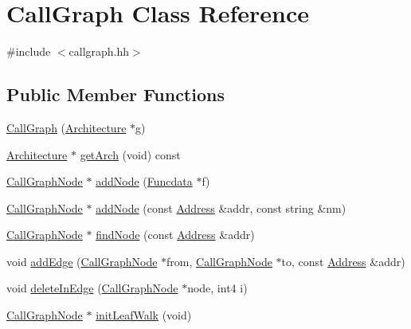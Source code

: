 \hypertarget{class_call_graph}{}\section{Call\+Graph Class Reference}
\label{class_call_graph}


{\ttfamily \#include $<$callgraph.\+hh$>$}

\subsection*{Public Member Functions}
\begin{DoxyCompactItemize}
\item 
\mbox{\hyperlink{class_call_graph_a4e571ae9abe012afa6265dd7b95835cb}{Call\+Graph}} (\mbox{\hyperlink{class_architecture}{Architecture}} $\ast$g)
\item 
\mbox{\hyperlink{class_architecture}{Architecture}} $\ast$ \mbox{\hyperlink{class_call_graph_a8c6cd0bdd5cfc3e3e5b34890820de311}{get\+Arch}} (void) const
\item 
\mbox{\hyperlink{class_call_graph_node}{Call\+Graph\+Node}} $\ast$ \mbox{\hyperlink{class_call_graph_ae04a791d05bc2b05942e33ab58f01f45}{add\+Node}} (\mbox{\hyperlink{class_funcdata}{Funcdata}} $\ast$f)
\item 
\mbox{\hyperlink{class_call_graph_node}{Call\+Graph\+Node}} $\ast$ \mbox{\hyperlink{class_call_graph_ae89cb838d6da0c1febdb1e52e38c1e35}{add\+Node}} (const \mbox{\hyperlink{class_address}{Address}} \&addr, const string \&nm)
\item 
\mbox{\hyperlink{class_call_graph_node}{Call\+Graph\+Node}} $\ast$ \mbox{\hyperlink{class_call_graph_afcb9ae755c10124ffae9e3808993a5bc}{find\+Node}} (const \mbox{\hyperlink{class_address}{Address}} \&addr)
\item 
void \mbox{\hyperlink{class_call_graph_ad7507630c86bb153d772f48d00210b48}{add\+Edge}} (\mbox{\hyperlink{class_call_graph_node}{Call\+Graph\+Node}} $\ast$from, \mbox{\hyperlink{class_call_graph_node}{Call\+Graph\+Node}} $\ast$to, const \mbox{\hyperlink{class_address}{Address}} \&addr)
\item 
void \mbox{\hyperlink{class_call_graph_a6433c96e380e121b3b4f200714996fe4}{delete\+In\+Edge}} (\mbox{\hyperlink{class_call_graph_node}{Call\+Graph\+Node}} $\ast$node, int4 i)
\item 
\mbox{\hyperlink{class_call_graph_node}{Call\+Graph\+Node}} $\ast$ \mbox{\hyperlink{class_call_graph_a226293ff8bec627b62cf0759fa5a4352}{init\+Leaf\+Walk}} (void)

\end{DoxyCompactItemize}
